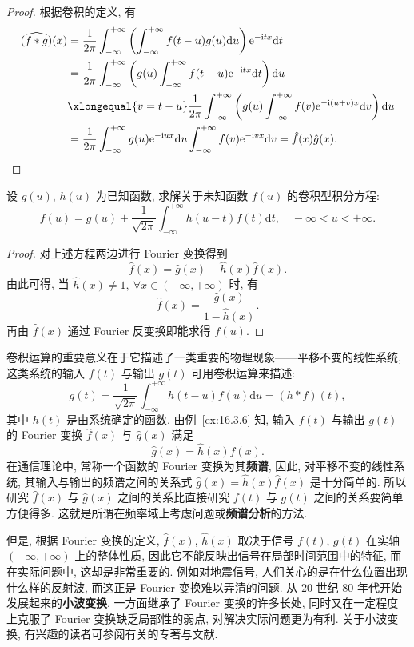 \begin{proof}
根据卷积的定义, 有
\begin{align*}
  (\widehat{f*g})(x)&=\frac{1}{2\pi}\int_{-\infty}^{+\infty}\left(\int_{-\infty}^{+\infty}f(t-u)g(u)\mathrm{d}u\right)\mathrm{e}^{-\mathrm{i}tx}\mathrm{d}t\\
  &=\frac{1}{2\pi}\int_{-\infty}^{+\infty}\left(g(u)\int_{-\infty}^{+\infty}f(t-u)\mathrm{e}^{-\mathrm{i}tx}\mathrm{d}t\right)\mathrm{d}u\\
  &\xlongequal{v=t-u}\frac{1}{2\pi}\int_{-\infty}^{+\infty}\left(g(u)\int_{-\infty}^{+\infty}f(v)\mathrm{e}^{-\mathrm{i}(u+v)x}\mathrm{d}v\right)\mathrm{d}u\\
  &=\frac{1}{2\pi}\int_{-\infty}^{+\infty}g(u)\mathrm{e}^{-\mathrm{i}ux}\mathrm{d}u\int_{-\infty}^{+\infty}f(v)\mathrm{e}^{-\mathrm{i}vx}\mathrm{d}v=\hat{f}(x)\hat{g}(x).
\end{align*}
\end{proof}

\begin{example}\label{ex:16.3.7}
设 $g(u)$, $h(u)$ 为已知函数, 求解关于未知函数 $f(u)$ 的卷积型积分方程:
\[
  f(u)=g(u)+\frac{1}{\sqrt{2\pi}}\int_{-\infty}^{+\infty}h(u-t)f(t)\mathrm{d}t,\quad-\infty<u<+\infty.
\]
\end{example}

\begin{proof}
对上述方程两边进行 Fourier 变换得到
\[
  \hat{f}(x)=\hat{g}(x)+\hat{h}(x)\hat{f}(x).
\]
由此可得, 当 $\hat{h}(x)\neq1,\ \forall x\in(-\infty,+\infty)$ 时, 有
\[
  \hat{f}(x)=\frac{\hat{g}(x)}{1-\hat{h}(x)}.
\]
再由 $\hat{f}(x)$ 通过 Fourier 反变换即能求得 $f(u)$.
\end{proof}

卷积运算的重要意义在于它描述了一类重要的物理现象——平移不变的线性系统, 这类系统的输入 $f(t)$ 与输出 $g(t)$ 可用卷积运算来描述:
\[
  g(t)=\frac{1}{\sqrt{2\pi}}\int_{-\infty}^{+\infty}h(t-u)f(u)\mathrm{d}u=(h*f)(t),
\]
其中 $h(t)$ 是由系统确定的函数. 由例~\ref{ex:16.3.6} 知, 输入 $f(t)$ 与输出 $g(t)$ 的 Fourier 变换 $\hat{f}(x)$ 与 $\hat{g}(x)$ 满足
\[
  \hat{g}(x)=\hat{h}(x)\hat{f}(x).
\]
在通信理论中, 常称一个函数的 Fourier 变换为其\textbf{频谱}, 因此, 对平移不变的线性系统, 其输入与输出的频谱之间的关系式 $\hat{g}(x)=\hat{h}(x)\hat{f}(x)$ 是十分简单的. 所以研究 $\hat{f}(x)$ 与 $\hat{g}(x)$ 之间的关系比直接研究 $f(t)$ 与 $g(t)$ 之间的关系要简单方便得多. 这就是所谓在频率域上考虑问题或\textbf{频谱分析}的方法.

但是, 根据 Fourier 变换的定义, $\hat{f}(x)$, $\hat{h}(x)$ 取决于信号 $f(t)$, $g(t)$ 在实轴 $(-\infty,+\infty)$ 上的整体性质, 因此它不能反映出信号在局部时间范围中的特征, 而在实际问题中, 这却是非常重要的. 例如对地震信号, 人们关心的是在什么位置出现什么样的反射波, 而这正是 Fourier 变换难以弄清的问题. 从 $20$ 世纪 $80$ 年代开始发展起来的\textbf{小波变换}, 一方面继承了 Fourier 变换的许多长处, 同时又在一定程度上克服了 Fourier 变换缺乏局部性的弱点, 对解决实际问题更为有利. 关于小波变换, 有兴趣的读者可参阅有关的专著与文献.

